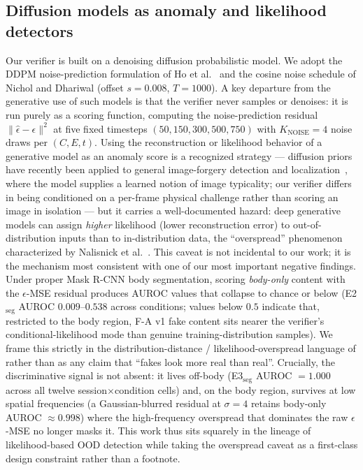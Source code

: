 \subsection{Diffusion models as anomaly and likelihood detectors}
Our verifier is built on a denoising diffusion probabilistic model. We adopt the DDPM noise-prediction formulation of Ho et al.\ \cite{ho2020ddpm} and the cosine noise schedule of Nichol and Dhariwal \cite{nicholdhariwal2021} (offset $s=0.008$, $T=1000$). A key departure from the generative use of such models is that the verifier never samples or denoises: it is run purely as a scoring function, computing the noise-prediction residual $\lVert \hat{\epsilon}-\epsilon\rVert^2$ at five fixed timesteps $(50,150,300,500,750)$ with $K_{\text{NOISE}}=4$ noise draws per $(C,E,t)$. Using the reconstruction or likelihood behavior of a generative model as an anomaly score is a recognized strategy --- diffusion priors have recently been applied to general image-forgery detection and localization~\cite{yu2024diffforensics}, where the model supplies a learned notion of image typicality; our verifier differs in being conditioned on a per-frame physical challenge rather than scoring an image in isolation --- but it carries a well-documented hazard: deep generative models can assign \emph{higher} likelihood (lower reconstruction error) to out-of-distribution inputs than to in-distribution data, the ``overspread'' phenomenon characterized by Nalisnick et al.\ \cite{nalisnick2019}. This caveat is not incidental to our work; it is the mechanism most consistent with one of our most important negative findings. Under proper Mask R-CNN \cite{he2017maskrcnn} body segmentation, scoring \emph{body-only} content with the $\epsilon$-MSE residual produces AUROC values that collapse to chance or below (E2$_{\mathrm{seg}}$ AUROC $0.009$--$0.538$ across conditions; values below $0.5$ indicate that, restricted to the body region, F-A v1 fake content sits nearer the verifier's conditional-likelihood mode than genuine training-distribution samples). We frame this strictly in the distribution-distance / likelihood-overspread language of \cite{nalisnick2019} rather than as any claim that ``fakes look more real than real''. Crucially, the discriminative signal is not absent: it lives off-body (E3$_{\mathrm{seg}}$ AUROC $=1.000$ across all twelve session$\times$condition cells) and, on the body region, survives at low spatial frequencies (a Gaussian-blurred residual at $\sigma=4$ retains body-only AUROC $\approx 0.998$) where the high-frequency overspread that dominates the raw $\epsilon$-MSE no longer masks it. This work thus sits squarely in the lineage of likelihood-based OOD detection while taking the overspread caveat as a first-class design constraint rather than a footnote.


